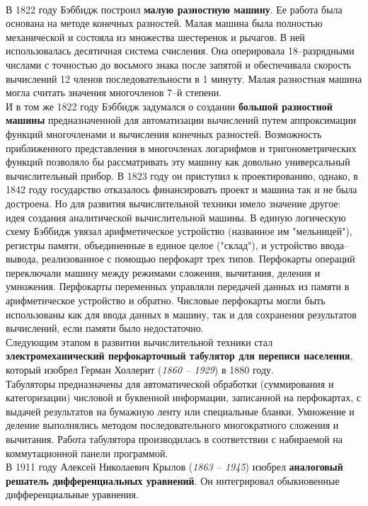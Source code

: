 \\В 1822 году Бэббидж построил \textbf{малую разностную машину}. Ее работа была основана на методе конечных разностей. Малая машина была полностью механической и состояла из множества шестеренок и рычагов. В ней использовалась десятичная система счисления. Она оперировала 18--разрядными числами с точностью до восьмого знака после запятой и обеспечивала скорость вычислений 12 членов последовательности в 1 минуту. Малая разностная машина могла считать значения многочленов 7--й степени.
\\И в том же 1822 году Бэббидж задумался о создании \textbf{большой разностной машины} предназначенной для автоматизации вычислений путем аппроксимации функций многочленами и вычисления конечных разностей. Возможность приближенного представления в многочленах логарифмов и тригонометрических функций позволяло бы рассматривать эту машину как довольно универсальный вычислительный прибор. В 1823 году он приступил к проектированию, однако, в 1842 году государство отказалось финансировать проект и машина так и не была достроена. Но для развития вычислительной техники имело значение другое: идея создания аналитической вычислительной машины. В единую логическую схему Бэббидж увязал арифметическое устройство (названное им "мельницей"), регистры памяти, объединенные в единое целое ("склад"), и устройство ввода--вывода, реализованное с помощью перфокарт трех типов. Перфокарты операций переключали машину между режимами сложения, вычитания, деления и умножения. Перфокарты переменных управляли передачей данных из памяти в арифметическое устройство и обратно. Числовые перфокарты могли быть использованы как для ввода данных в машину, так и для сохранения результатов вычислений, если памяти было недостаточно.
\\Следующим этапом в развитии вычислительной техники стал \textbf{электромеханический перфокарточный табулятор для переписи населения}, который изобрел Герман Холлерит (\emph{1860 -- 1929}) в 1880 году.
\\Табуляторы предназначены для автоматической обработки (суммирования и категоризации) числовой и буквенной информации, записанной на перфокартах, с выдачей результатов на бумажную ленту или специальные бланки. Умножение и деление выполнялись методом последовательного многократного сложения и вычитания. Работа табулятора производилась в соответствии с набираемой на коммутационной панели программой.
\\В 1911 году Алексей Николаевич Крылов (\emph{1863 -- 1945}) изобрел \textbf{аналоговый решатель дифференциальных уравнений}. Он интегрировал обыкновенные дифференциальные уравнения.
